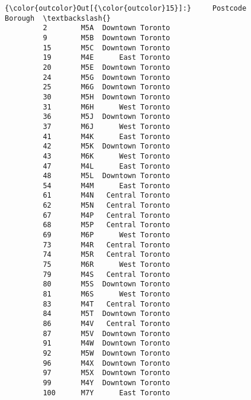 \documentclass[11pt]{article}
\begin{document}
\begin{Verbatim}[commandchars=\\\{\}]
{\color{outcolor}Out[{\color{outcolor}15}]:}     Postcode           Borough  \textbackslash{}
         2        M5A  Downtown Toronto   
         9        M5B  Downtown Toronto   
         15       M5C  Downtown Toronto   
         19       M4E      East Toronto   
         20       M5E  Downtown Toronto   
         24       M5G  Downtown Toronto   
         25       M6G  Downtown Toronto   
         30       M5H  Downtown Toronto   
         31       M6H      West Toronto   
         36       M5J  Downtown Toronto   
         37       M6J      West Toronto   
         41       M4K      East Toronto   
         42       M5K  Downtown Toronto   
         43       M6K      West Toronto   
         47       M4L      East Toronto   
         48       M5L  Downtown Toronto   
         54       M4M      East Toronto   
         61       M4N   Central Toronto   
         62       M5N   Central Toronto   
         67       M4P   Central Toronto   
         68       M5P   Central Toronto   
         69       M6P      West Toronto   
         73       M4R   Central Toronto   
         74       M5R   Central Toronto   
         75       M6R      West Toronto   
         79       M4S   Central Toronto   
         80       M5S  Downtown Toronto   
         81       M6S      West Toronto   
         83       M4T   Central Toronto   
         84       M5T  Downtown Toronto   
         86       M4V   Central Toronto   
         87       M5V  Downtown Toronto   
         91       M4W  Downtown Toronto   
         92       M5W  Downtown Toronto   
         96       M4X  Downtown Toronto   
         97       M5X  Downtown Toronto   
         99       M4Y  Downtown Toronto   
         100      M7Y      East Toronto   
         

\end{Verbatim}
\end{document}
